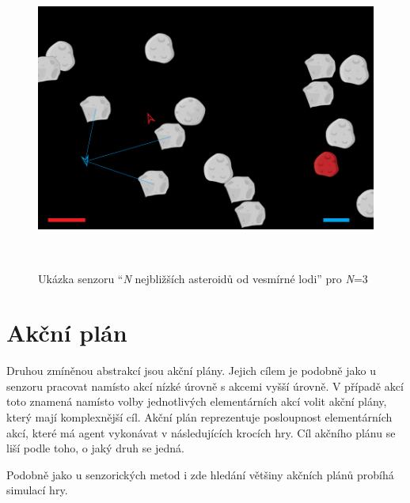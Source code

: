 \begin{figure}[hp]

\includegraphics[width=145mm, height=100mm]{./Obrazky/N_nearest_asteroids.png}
\caption{Ukázka senzoru ``\emph{N} nejbližších asteroidů od vesmírné lodi'' pro \emph{N}=3}
\label{obr02:}
\end{figure}


\section{Akční plán}
Druhou zmíněnou abstrakcí jsou akční plány. Jejich cílem je podobně jako u senzoru pracovat namísto akcí nízké úrovně s akcemi vyšší úrovně. V případě akcí toto znamená namísto volby jednotlivých elementárních akcí volit akční plány, který mají komplexnější cíl.
Akční plán reprezentuje posloupnost elementárních akcí, které má agent vykonávat v následujících krocích hry.
Cíl akčního plánu se liší podle toho, o jaký druh se jedná.
\par
Podobně jako u senzorických metod i zde hledání většiny akčních plánů probíhá simulací hry.

